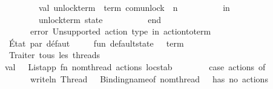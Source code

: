 \begin{isabellebody}
\ \ \ \ \ \ \ \ \ \ \ \ val\ unlock{\isacharunderscore}{\kern0pt}term\ {\isacharequal}{\kern0pt}\ {\isacharat}{\kern0pt}{\isacharbraceleft}{\kern0pt}term\ com{\isachardot}{\kern0pt}unlock{\isacharbraceright}{\kern0pt}\ {\isachardollar}{\kern0pt}\ n\isanewline
\ \ \ \ \ \ \ \ \ \ in\isanewline
\ \ \ \ \ \ \ \ \ \ \ \ {\isacharparenleft}{\kern0pt}unlock{\isacharunderscore}{\kern0pt}term{\isacharcomma}{\kern0pt}\ state{\isacharparenright}{\kern0pt}\isanewline
\ \ \ \ \ \ \ \ \ \ end\isanewline
\isanewline
\ \ \ \ \ \ {\isacharbar}{\kern0pt}\ {\isacharunderscore}{\kern0pt}\ {\isacharequal}{\kern0pt}{\isachargreater}{\kern0pt}\ \isanewline
\ \ \ \ \ \ \ \ \ \ error\ {\isacharparenleft}{\kern0pt}{\isachardoublequote}{\kern0pt}Unsupported\ action\ type\ in\ action{\isacharunderscore}{\kern0pt}to{\isacharunderscore}{\kern0pt}term{\isachardoublequote}{\kern0pt}{\isacharparenright}{\kern0pt}\isanewline
\isanewline
\ \ \ \ {\isacharparenleft}{\kern0pt}{\isacharasterisk}{\kern0pt}\ État\ par\ défaut\ {\isacharasterisk}{\kern0pt}{\isacharparenright}{\kern0pt}\isanewline
\ \ \ \ fun\ default{\isacharunderscore}{\kern0pt}state\ {\isacharparenleft}{\kern0pt}{\isacharunderscore}{\kern0pt}\ {\isacharcolon}{\kern0pt}\ term{\isacharparenright}{\kern0pt}\ {\isacharequal}{\kern0pt}\ {}\isanewline
\isanewline
\ \ \ \ {\isacharparenleft}{\kern0pt}{\isacharasterisk}{\kern0pt}\ Traiter\ tous\ les\ threads\ {\isacharasterisk}{\kern0pt}{\isacharparenright}{\kern0pt}\isanewline
\ \ \ \ val\ {\isacharunderscore}{\kern0pt}\ {\isacharequal}{\kern0pt}\ List{\isachardot}{\kern0pt}app\ {\isacharparenleft}{\kern0pt}fn\ {\isacharbraceleft}{\kern0pt}nom{\isacharunderscore}{\kern0pt}thread{\isacharcomma}{\kern0pt}\ actions{\isacharcomma}{\kern0pt}\ locstab{\isacharcomma}{\kern0pt}\ {\isachardot}{\kern0pt}{\isachardot}{\kern0pt}{\isachardot}{\kern0pt}{\isacharbraceright}{\kern0pt}\ {\isacharequal}{\kern0pt}{\isachargreater}{\kern0pt}\isanewline
\ \ \ \ \ \ case\ actions\ of\isanewline
\ \ \ \ \ \ \ \ {\isacharbrackleft}{\kern0pt}{\isacharbrackright}{\kern0pt}\ {\isacharequal}{\kern0pt}{\isachargreater}{\kern0pt}\ writeln\ {\isacharparenleft}{\kern0pt}{\isachardoublequote}{\kern0pt}Thread\ {\isachardoublequote}{\kern0pt}\ {\isacharcircum}{\kern0pt}\ Binding{\isachardot}{\kern0pt}name{\isacharunderscore}{\kern0pt}of\ nom{\isacharunderscore}{\kern0pt}thread\ {\isacharcircum}{\kern0pt}\ {\isachardoublequote}{\kern0pt}\ has\ no\ actions{\isachardoublequote}{\kern0pt}{\isacharparenright}{\kern0pt}\isanewline
\ \ \ \ \ \ {\isacharbar}{\kern0pt}\ {\isacharunderscore}{\kern0pt}\ {\isacharequal}{\kern0pt}{\isachargreater}{\kern0pt}\isanewline

\end{isabellebody}
